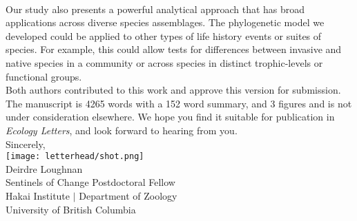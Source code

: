 \documentclass[11pt,a4paper]{article}
\begin{document}
\vspace{1.5ex}\\
Our study also presents a powerful analytical approach that has broad applications across diverse species assemblages. The phylogenetic model we developed could be applied to other types of life history events or suites of species. For example, this could allow tests for differences between invasive and native species in a community or across species in distinct trophic-levels or functional groups.
\vspace{1.5ex}\\
\noindent Both authors contributed to this work and approve this version for submission. The manuscript is 4265 words with a 152 word summary, and 3 figures and is not under consideration elsewhere. We hope you find it suitable for publication in \emph{Ecology Letters}, and look forward to hearing from you. 
\vspace{1.5ex}\\
\noindent Sincerely, \\
\texttt{[image: letterhead/shot.png]} \\ 
\noindent Deirdre Loughnan\\
\noindent Sentinels of Change Postdoctoral Fellow\\ %
\noindent Hakai Institute $|$ Department of Zoology\\
\noindent University of British Columbia
\newpage
\vspace{-5ex}
% 


\newpage
\end{document}
